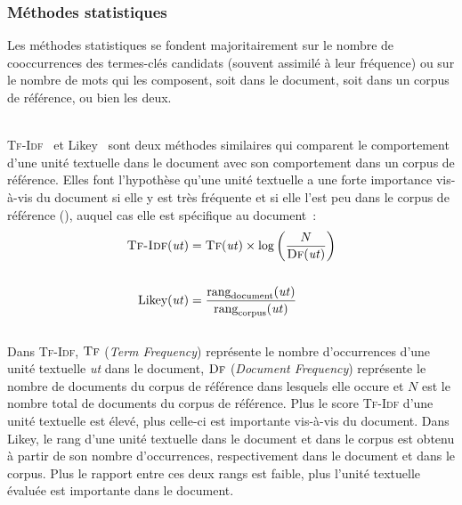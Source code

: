       \subsubsection{Méthodes statistiques}
      \label{subsubsec:main-state_of_the_art-automatic_keyphrase_extraction-unsupervised_keyphrase_extraction-statistical_approaches}
        Les méthodes statistiques se fondent majoritairement sur le nombre de
        cooccurrences des termes-clés candidats (souvent assimilé à leur
        fréquence) ou sur le nombre de mots qui les composent, soit dans le
        document, soit dans un corpus de référence, ou bien les deux.

        ~\\\textsc{Tf-Idf}~\cite{jones1972tfidf} et Likey~\cite{paukkeri2010likey}
        sont deux méthodes similaires qui comparent le comportement d'une unité
        textuelle dans le document avec son comportement dans un corpus de
        référence. Elles font l'hypothèse qu'une unité textuelle a une forte
        importance vis-à-vis du document si elle y est très fréquente et si elle
        l'est peu dans le corpus de référence (), auquel cas elle
        est spécifique au document~:
        \begin{align}
          \text{\textsc{Tf-Idf}}(\text{\textit{ut}}) &= \textsc{Tf}(\text{\textit{ut}}) \times \log\left(\frac{N}{\textsc{Df}(\text{\textit{ut}})}\right) \label{math:tfidf}\\
          \notag\\
          \text{Likey}(\text{\textit{ut}}) &= \frac{\text{rang}_{\text{document}}(\text{\textit{ut}})}{\text{rang}_{\text{corpus}}(\text{\textit{ut}})} \label{math:likey}
        \end{align}\\
        Dans \textsc{Tf-Idf}, $\textsc{Tf}$ (\textit{Term Frequency}) représente
        le nombre d'occurrences d'une unité textuelle \textit{ut} dans le
        document, $\textsc{Df}$ (\textit{Document Frequency}) représente le
        nombre de documents du corpus de référence dans lesquels elle occure
        et $N$ est le nombre total de documents du corpus de référence. Plus le
        score \textsc{Tf-Idf} d'une unité textuelle est élevé, plus celle-ci est
        importante vis-à-vis du document. Dans Likey, le rang d'une unité
        textuelle dans le document et dans le corpus est obtenu à partir de son
        nombre d'occurrences, respectivement dans le document et dans le corpus.
        Plus le rapport entre ces deux rangs est faible, plus l'unité textuelle
        évaluée est importante dans le document.

